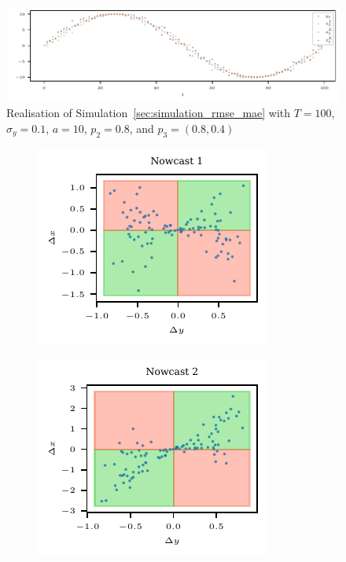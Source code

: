 \documentclass[oneside]{article}
\theoremstyle{plain}%
\theoremstyle{definition}
\begin{document}
\begin{figure}
  \centering
  \includegraphics{plots/simulation_same_rmse_mae/time_series.pdf}
  \caption{Realisation of Simulation~\ref{sec:simulation_rmse_mae} with $T = 100$, $\sigma_y=0.1$, $a = 10$, $p_2 = 0.8$, and $p_3 = (0.8, 0.4)$}
  \label{fig:simulation_rmse_mae_ts}
\end{figure}

\begin{figure}
  \centering
  \begin{subfigure}{.32\textwidth}
  	\includegraphics{plots/simulation_same_rmse_mae/4q_plot_1}
  \end{subfigure}
  \begin{subfigure}{.32\textwidth}
  	\includegraphics{plots/simulation_same_rmse_mae/4q_plot_2}
  \end{subfigure}
    \begin{subfigure}{.32\textwidth}

\end{subfigure}
\end{figure}
\end{document}

